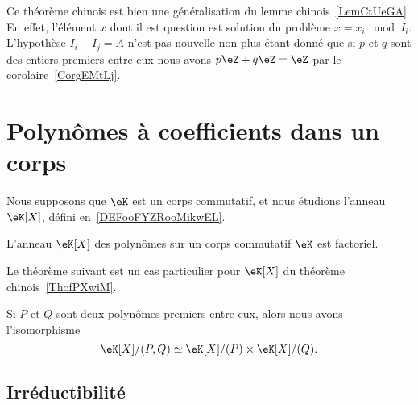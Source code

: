 \begin{remark}
	Ce théorème chinois est bien une généralisation du lemme chinois~\ref{LemCtUeGA}. En effet, l'élément \( x\) dont il est question est solution du problème \( x=x_i\mod I_i\). L'hypothèse \( I_i+I_j=A\) n'est pas nouvelle non plus étant donné que si \( p\) et \( q\) sont des entiers premiers entre eux nous avons \( p\eZ+q\eZ=\eZ\) par le corolaire~\ref{CorgEMtLj}.
\end{remark}

\section{Polynômes à coefficients dans un corps}
\label{SECooFYOGooQHitgE}

Nous supposons que \( \eK\) est un corps commutatif, et nous étudions l'anneau \( \eK[X]\), défini en~\ref{DEFooFYZRooMikwEL}.

\begin{proposition}     \label{PropqGZXvr}
	L'anneau \( \eK[X]\) des polynômes sur un corps commutatif \( \eK\) est factoriel.
\end{proposition}

Le théorème suivant est un cas particulier pour \( \eK[X]\) du théorème chinois~\ref{ThofPXwiM}.
\begin{theorem}      \label{THOooICTTooQlvHNb}
	Si \( P\) et \( Q\) sont deux polynômes premiers entre eux, alors nous avons l'isomorphisme
	\begin{equation}
		\eK[X]/(P,Q)\simeq\eK[X]/(P)\times \eK[X]/(Q).
	\end{equation}
\end{theorem}


\subsection{Irréductibilité}

